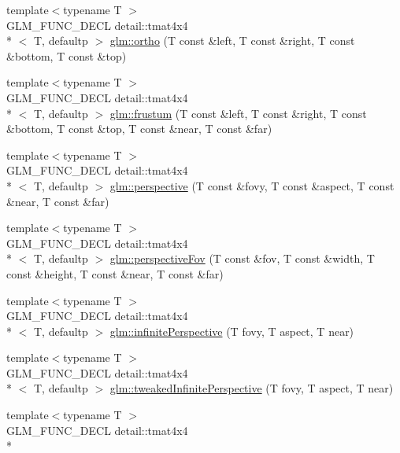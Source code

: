 \begin{DoxyCompactItemize}
{\footnotesize template$<$typename T $>$ }\\G\-L\-M\-\_\-\-F\-U\-N\-C\-\_\-\-D\-E\-C\-L detail\-::tmat4x4\\*
$<$ T, defaultp $>$ \hyperlink{group__gtc__matrix__transform_gab03587bce3510aa5d2f4e5f1be6c2370}{glm\-::ortho} (T const \&left, T const \&right, T const \&bottom, T const \&top)
\item 
{\footnotesize template$<$typename T $>$ }\\G\-L\-M\-\_\-\-F\-U\-N\-C\-\_\-\-D\-E\-C\-L detail\-::tmat4x4\\*
$<$ T, defaultp $>$ \hyperlink{group__gtc__matrix__transform_ga486d3d6819c04880559f3dccd38f9f58}{glm\-::frustum} (T const \&left, T const \&right, T const \&bottom, T const \&top, T const \&near, T const \&far)
\item 
{\footnotesize template$<$typename T $>$ }\\G\-L\-M\-\_\-\-F\-U\-N\-C\-\_\-\-D\-E\-C\-L detail\-::tmat4x4\\*
$<$ T, defaultp $>$ \hyperlink{group__gtc__matrix__transform_ga6c82aa0ea748cfbb16887d81cf6c5a10}{glm\-::perspective} (T const \&fovy, T const \&aspect, T const \&near, T const \&far)
\item 
{\footnotesize template$<$typename T $>$ }\\G\-L\-M\-\_\-\-F\-U\-N\-C\-\_\-\-D\-E\-C\-L detail\-::tmat4x4\\*
$<$ T, defaultp $>$ \hyperlink{group__gtc__matrix__transform_gac00bf68d4f7ec62380b84c5354567f71}{glm\-::perspective\-Fov} (T const \&fov, T const \&width, T const \&height, T const \&near, T const \&far)
\item 
{\footnotesize template$<$typename T $>$ }\\G\-L\-M\-\_\-\-F\-U\-N\-C\-\_\-\-D\-E\-C\-L detail\-::tmat4x4\\*
$<$ T, defaultp $>$ \hyperlink{group__gtc__matrix__transform_ga63ba1ddb9c4a08d4e58becd0dc5b725a}{glm\-::infinite\-Perspective} (T fovy, T aspect, T near)
\item 
{\footnotesize template$<$typename T $>$ }\\G\-L\-M\-\_\-\-F\-U\-N\-C\-\_\-\-D\-E\-C\-L detail\-::tmat4x4\\*
$<$ T, defaultp $>$ \hyperlink{group__gtc__matrix__transform_ga9d67732836d71a79dc21eb8f87603cb7}{glm\-::tweaked\-Infinite\-Perspective} (T fovy, T aspect, T near)
\item 
{\footnotesize template$<$typename T $>$ }\\G\-L\-M\-\_\-\-F\-U\-N\-C\-\_\-\-D\-E\-C\-L detail\-::tmat4x4\\*

\end{DoxyCompactItemize}
